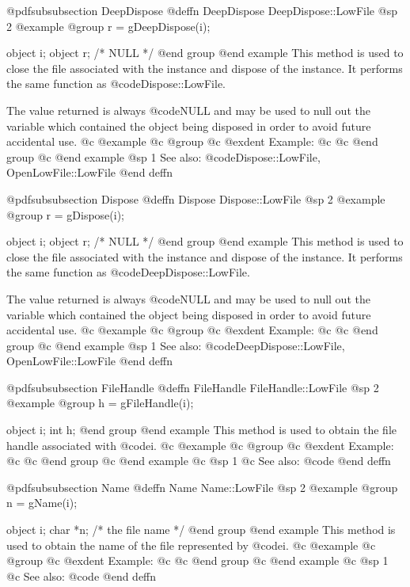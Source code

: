 @pdfsubsubsection {DeepDispose}
@deffn {DeepDispose} DeepDispose::LowFile
@sp 2
@example
@group
r = gDeepDispose(i);

object  i;
object  r;     /*  NULL  */
@end group
@end example
This method is used to close the file associated with the instance and
dispose of the instance.  It performs the same function as
@code{Dispose::LowFile}.  

The value returned is always @code{NULL} and may be used to null out
the variable which contained the object being disposed in order to
avoid future accidental use.
@c @example
@c @group
@c @exdent Example:
@c 
@c @end group
@c @end example
@sp 1
See also:  @code{Dispose::LowFile, OpenLowFile::LowFile}
@end deffn











@pdfsubsubsection {Dispose}
@deffn {Dispose} Dispose::LowFile
@sp 2
@example
@group
r = gDispose(i);

object  i;
object  r;     /*  NULL  */
@end group
@end example
This method is used to close the file associated with the instance and
dispose of the instance.  It performs the same function as
@code{DeepDispose::LowFile}.  

The value returned is always @code{NULL} and may be used to null out
the variable which contained the object being disposed in order to
avoid future accidental use.
@c @example
@c @group
@c @exdent Example:
@c 
@c @end group
@c @end example
@sp 1
See also:  @code{DeepDispose::LowFile, OpenLowFile::LowFile}
@end deffn












@pdfsubsubsection {FileHandle}
@deffn {FileHandle} FileHandle::LowFile
@sp 2
@example
@group
h = gFileHandle(i);

object  i;
int     h;
@end group
@end example
This method is used to obtain the file handle associated with @code{i}.
@c @example
@c @group
@c @exdent Example:
@c 
@c @end group
@c @end example
@c @sp 1
@c See also:  @code{}
@end deffn









@pdfsubsubsection {Name}
@deffn {Name} Name::LowFile
@sp 2
@example
@group
n = gName(i);

object  i;
char    *n;  /*  the file name  */
@end group
@end example
This method is used to obtain the name of the file represented by @code{i}.
@c @example
@c @group
@c @exdent Example:
@c 
@c @end group
@c @end example
@c @sp 1
@c See also:  @code{}
@end deffn



